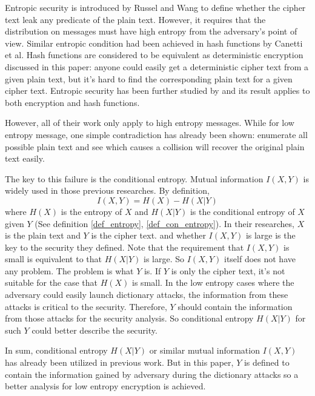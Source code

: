 \documentclass[10pt, conference, compsocconf]{IEEEtran}
\begin{document}
	Entropic security is introduced by Russel and Wang\cite{Russel02howto} to define
	whether the cipher text leak any predicate of the plain text. However,
	it requires that the distribution on messages must have high entropy from
	the adversary's point of view. Similar entropic condition had been
	achieved in hash functions by Canetti et al\cite{Canetti97towardsrealizing, Canetti_perfectlyone-way}. 
	Hash functions are
	considered to be equivalent as deterministic encryption discussed in this
	paper: anyone could easily get a deterministic cipher text from a
	given plain text, but it's hard to find the corresponding plain text
	for a given cipher text. Entropic security has been further 
	studied by \cite{entropic_wang}
	and its result applies to both encryption and hash functions.
	
	However, all of their work only apply to high entropy messages.
	While for low entropy message, 
	one simple contradiction has already been
	shown: enumerate all possible plain text and see which causes a collision
	will recover the original plain text easily.
	
	The key to this failure is the conditional entropy. Mutual information
	$I(X, Y)$ is widely used in those previous researches. By definition,
	\begin{equation}
		I(X, Y) = H(X) - H(X|Y)
	\end{equation}
	where $H(X)$ is the entropy of $X$ and $H(X|Y)$ is the conditional entropy
	of $X$ given $Y$ (See definition \ref{def_entropy}, \ref{def_con_entropy}).
	In their researches, $X$ is the plain text and $Y$ is the cipher text.
	and whether $I(X, Y)$ is large is the key to the security they defined.
	Note that the requirement that $I(X, Y)$ is small
	is equivalent to that $H(X|Y)$ is large. So $I(X, Y)$ itself does not have any problem.
	The problem is what $Y$ is.
	If $Y$ is only the cipher text, it's not suitable for the case that $H(X)$ is small.
	In the low entropy cases where the adversary could easily launch dictionary attacks,
	the information from these attacks is critical to the security. Therefore, $Y$
	should contain the information from those attacks for the security analysis.
	So conditional entropy $H(X|Y)$ for such $Y$ could better describe the security. 
		
	In sum, conditional entropy $H(X|Y)$ or similar mutual information $I(X, Y)$
	has already been utilized in previous work. But in this paper, $Y$ is defined to contain the information
	gained by adversary during the dictionary attacks so a better analysis
	for low entropy encryption is achieved.
	
\end{document}
